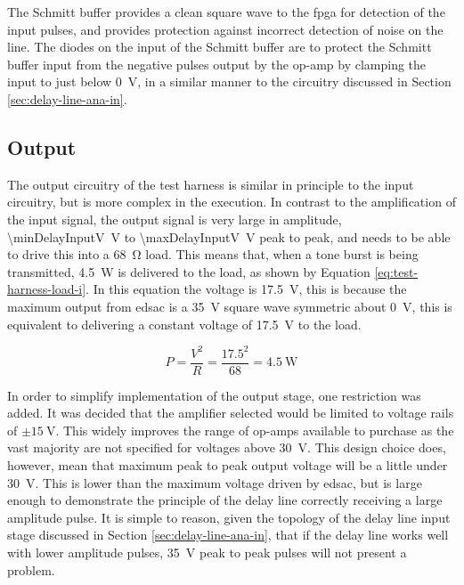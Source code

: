The Schmitt buffer provides a clean square wave to the \gls{fpga} for detection of the input pulses, and provides protection against incorrect detection of noise on the line. The diodes on the input of the Schmitt buffer are to protect the Schmitt buffer input from the negative pulses output by the op-amp by clamping the input to just below \SI{0}{\volt}, in a similar manner to the circuitry discussed in Section \ref{sec:delay-line-ana-in}.

\subsection{Output}

The output circuitry of the test harness is similar in principle to the input circuitry, but is more complex in the execution. In contrast to the amplification of the input signal, the output signal is very large in amplitude, \SI{\minDelayInputV}{\volt} to \SI{\maxDelayInputV}{\volt} peak to peak, and needs to be able to drive this into a \SI{68}{\ohm} load. This means that, when a tone burst is being transmitted, \SI{4.5}{\watt} is delivered to the load, as shown by Equation \ref{eq:test-harness-load-i}. In this equation the voltage is \SI{17.5}{\volt}, this is because the maximum output from \gls{edsac} is a \SI{35}{\volt} square wave symmetric about \SI{0}{\volt}, this is equivalent to delivering a constant voltage of \SI{17.5}{\volt} to the load.

\begin{equation}
P = \frac{V^2}{R} = \frac{17.5^2}{68} = \SI{4.5}{\watt} \label{eq:test-harness-load-i}
\end{equation}

In order to simplify implementation of the output stage, one restriction was added. It was decided that the amplifier selected would be limited to voltage rails of $\pm \SI{15}{\volt}$. This widely improves the range of op-amps available to purchase as the vast majority are not specified for voltages above \SI{30}{\volt}. This design choice does, however, mean that maximum peak to peak output voltage will be a little under \SI{30}{\volt}. This is lower than the maximum voltage driven by \gls{edsac}, but is large enough to demonstrate the principle of the delay line correctly receiving a large amplitude pulse. It is simple to reason, given the topology of the delay line input stage discussed in Section \ref{sec:delay-line-ana-in}, that if the delay line works well with lower amplitude pulses, \SI{35}{\volt} peak to peak pulses will not present a problem.

